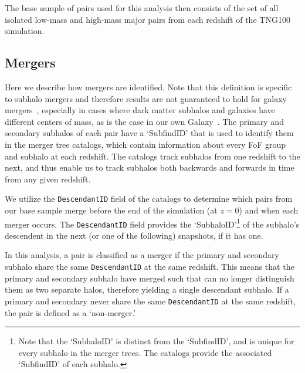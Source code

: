 \documentclass[twocolumn,linenumbers]{aastex631}
\begin{document}

The base sample of pairs used for this analysis then consists of the set of all
isolated 
low-mass and high-mass major pairs from each redshift of the TNG100 simulation. 

\subsection{Mergers} \label{subsec:mergers}
Here we describe how mergers are identified. 
Note that this definition is specific to subhalo mergers and therefore results are not guaranteed to hold for galaxy mergers~\citep[see e.g.,][]{RG2015,Patton2024}, especially in cases where dark matter subhalos and galaxies have different centers of mass, as is the case in our own Galaxy~\citep{Gomez2015,GaravitoCamargo2019,Petersen2021,Chamberlain2023}. %
The primary and secondary subhalos of each pair have a `SubfindID' that is used to identify them in the \subfind{} merger tree catalogs, which contain information about every FoF group and subhalo at each redshift. 
The \sublink{} catalogs track subhalos from one redshift to the next, and thus enable us to track subhalos both backwards and forwards in time from any given redshift. 

We utilize the \texttt{DescendantID} field of the \sublink{} catalogs to determine which pairs from our base sample merge before the end of the simulation (at $z=0$) and when each merger occurs. 
The \texttt{DescendantID} field provides the `SubhaloID'\footnote{Note that the `SubhaloID' is distinct from the `SubfindID', and is unique for every subhalo in the merger trees. 
The \sublink{} catalogs provide the associated `SubfindID' of each subhalo.} of the subhalo's descendent in the next (or one of the following) snapshots, if it has one. 

In this analysis, a pair is classified as a merger if the primary and secondary subhalo share the same \texttt{DescendantID} at the same redshift. 
This means that the primary and secondary subhalo have merged such that \subfind{} can no longer distinguish them as two separate halos, therefore yielding a single descendant subhalo.
If a primary and secondary never share the same \texttt{DescendantID} at the same redshift, the pair is defined as a `non-merger.'
\end{document}
